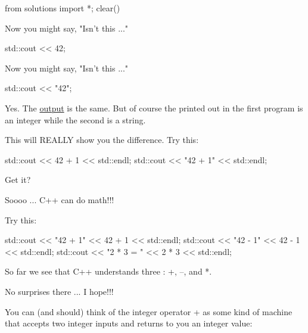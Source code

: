 \begin{python0}
from solutions import *; clear()
\end{python0}

Now you might say, "Isn't this ..."
\begin{console}
std::cout << 42;
\end{console}
Now you might say, "Isn't this ..."
\begin{console}
std::cout << "42";
\end{console}

Yes. The \underline{output} is the same. But of course the 
printed out in
the first program is an integer while the second is a string.

This will REALLY show you the difference. Try this:
\begin{console}
std::cout << 42 + 1 << std::endl;
std::cout << "42 + 1" << std::endl;
\end{console}

Get it?

Soooo ... C++ can do math!!!

Try this:
\begin{console}
std::cout << "42 + 1" << 42 + 1 << std::endl;
std::cout << "42 - 1" << 42 - 1 << std::endl;
std::cout << "2 * 3 = " << 2 * 3 << std::endl;
\end{console}

So far we see that C++ understands three : +, –, and *.

No surprises there ... I hope!!!

You can (and should) think of the integer operator + as some kind of
machine that accepts two integer inputs and returns to you an integer
value:

\begin{center}

\end{center}

